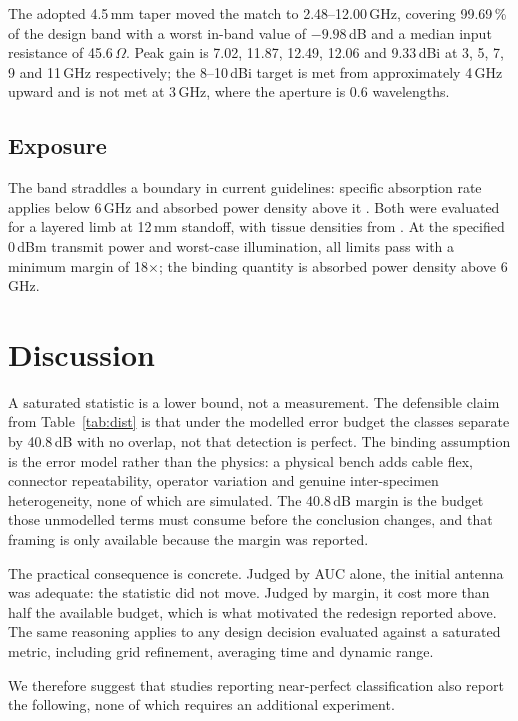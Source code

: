 \documentclass[conference]{IEEEtran}
\begin{document}
The adopted 4.5\,mm taper moved the
match to 2.48--12.00\,GHz, covering 99.69\,\% of the design band with a
worst in-band value of $-9.98$\,dB and a median input resistance of
45.6\,$\Omega$. Peak gain is 7.02, 11.87, 12.49, 12.06 and 9.33\,dBi at 3,
5, 7, 9 and 11\,GHz respectively; the 8--10\,dBi target is met from
approximately 4\,GHz upward and is not met at 3\,GHz, where the aperture is
0.6 wavelengths.

\subsection{Exposure}
The band straddles a boundary in current guidelines: specific absorption
rate applies below 6\,GHz and absorbed power density above it
\cite{icnirp,c951}. Both were evaluated for a layered limb at 12\,mm
standoff, with tissue densities from \cite{itis}. At the specified 0\,dBm
transmit power and worst-case illumination, all limits pass with a minimum
margin of 18$\times$; the binding quantity is absorbed power density above
6\,GHz.

\section{Discussion}

A saturated statistic is a lower bound, not a measurement. The defensible
claim from Table~\ref{tab:dist} is that under the modelled error budget the
classes separate by 40.8\,dB with no overlap, not that detection is perfect.
The binding assumption is the error model rather than the physics: a
physical bench adds cable flex, connector repeatability, operator variation
and genuine inter-specimen heterogeneity, none of which are simulated. The
40.8\,dB margin is the budget those unmodelled terms must consume before the
conclusion changes, and that framing is only available because the margin
was reported.

The practical consequence is concrete. Judged by AUC alone, the initial
antenna was adequate: the statistic did not move. Judged by margin, it cost
more than half the available budget, which is what motivated the redesign
reported above. The same reasoning applies to any design decision evaluated
against a saturated metric, including grid refinement, averaging time and
dynamic range.

We therefore suggest that studies reporting near-perfect classification also
report the following, none of which requires an additional experiment.
\end{document}
